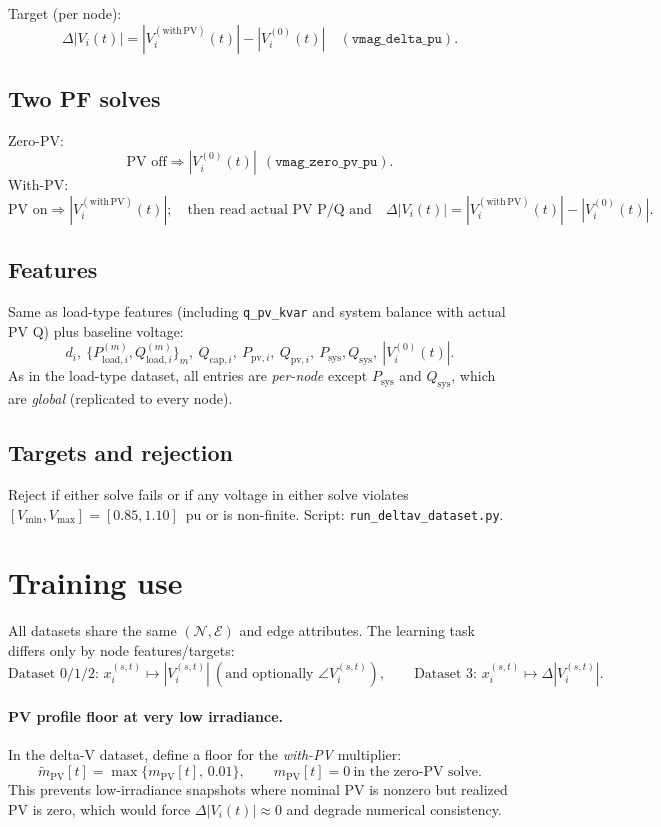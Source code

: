 \documentclass[11pt]{article}
\begin{document}
Target (per node):
\[
\Delta |V_i(t)| = |V_i^{(\mathrm{with\,PV})}(t)|-|V_i^{(0)}(t)|\quad (\texttt{vmag\_delta\_pu}).
\]

\subsection*{Two PF solves}

Zero-PV:
\[
\text{PV off}\Rightarrow |V_i^{(0)}(t)|\ \ (\texttt{vmag\_zero\_pv\_pu}).
\]
With-PV:
\[
\text{PV on}\Rightarrow |V_i^{(\mathrm{with\,PV})}(t)|;\quad
\text{then read actual PV P/Q and}\quad
\Delta|V_i(t)|=|V_i^{(\mathrm{with\,PV})}(t)|-|V_i^{(0)}(t)|.
\]

\subsection*{Features}

Same as load-type features (including \texttt{q\_pv\_kvar} and system balance with actual PV Q) plus baseline voltage:
\[
d_i,\ \{P^{(m)}_{\mathrm{load},i},Q^{(m)}_{\mathrm{load},i}\}_{m},\ Q_{\mathrm{cap},i},\
P_{\mathrm{pv},i},\ Q_{\mathrm{pv},i},\ P_{\mathrm{sys}},Q_{\mathrm{sys}},\ |V_i^{(0)}(t)|.
\]
As in the load-type dataset, all entries are \emph{per-node} except $P_{\mathrm{sys}}$ and $Q_{\mathrm{sys}}$, which are \emph{global} (replicated to every node).

\subsection*{Targets and rejection}

Reject if either solve fails or if any voltage in either solve violates $[V_{\min},V_{\max}]=[0.85,1.10]$~pu or is non-finite. Script: \texttt{run\_deltav\_dataset.py}.

\section{Training use}

All datasets share the same $(\mathcal{N},\mathcal{E})$ and edge attributes. The learning
task differs only by node features/targets:
\[
\text{Dataset 0/1/2: } x_{i}^{(s,t)}\mapsto |V_i^{(s,t)}| \ (\text{and optionally } \angle V_i^{(s,t)}),
\qquad
\text{Dataset 3: } x_{i}^{(s,t)}\mapsto \Delta|V_i^{(s,t)}|.
\]

\paragraph{PV profile floor at very low irradiance.}
In the delta-V dataset, define a floor for the \emph{with-PV} multiplier:
\[
\tilde m_{\mathrm{PV}}[t]=\max\{m_{\mathrm{PV}}[t],\,0.01\},
\qquad
m_{\mathrm{PV}}[t]=0\ \text{in the zero-PV solve}.
\]
This prevents low-irradiance snapshots where nominal PV is nonzero but realized PV is zero,
which would force $\Delta|V_i(t)|\approx 0$ and degrade numerical consistency.
\end{document}
